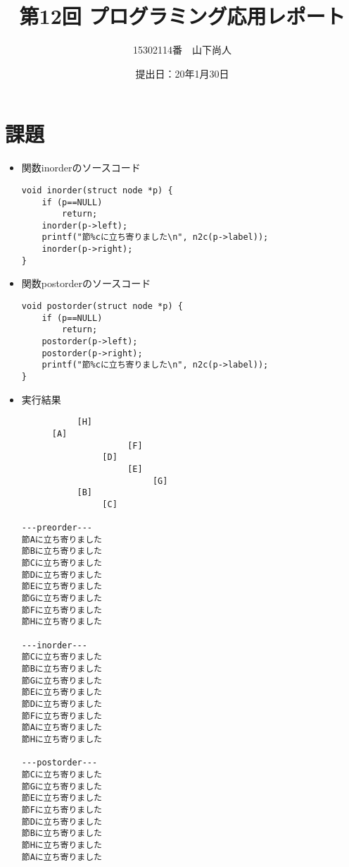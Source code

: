\documentclass[a4paper]{jsarticle}
\title{第12回 プログラミング応用レポート}
\author{15302114番　山下尚人}
\date{提出日：20年1月30日}
\begin{document}
\maketitle%

\section*{課題}
	\begin{itemize}
	\item 関数inorderのソースコード
		\begin{lstlisting}
void inorder(struct node *p) {
	if (p==NULL)
		return;
	inorder(p->left);
	printf("節%cに立ち寄りました\n", n2c(p->label));
	inorder(p->right);
}
		\end{lstlisting}
		\mbox{}\newline
	\item 関数postorderのソースコード
		\begin{lstlisting}
void postorder(struct node *p) {
	if (p==NULL)
		return;
	postorder(p->left);
	postorder(p->right);
	printf("節%cに立ち寄りました\n", n2c(p->label));
}
		\end{lstlisting}
		\mbox{}\newpage
	\item 実行結果
		\begin{lstlisting}
           [H]
      [A]
                     [F]
                [D]
                     [E]
                          [G]
           [B]
                [C]

---preorder---
節Aに立ち寄りました
節Bに立ち寄りました
節Cに立ち寄りました
節Dに立ち寄りました
節Eに立ち寄りました
節Gに立ち寄りました
節Fに立ち寄りました
節Hに立ち寄りました

---inorder---
節Cに立ち寄りました
節Bに立ち寄りました
節Gに立ち寄りました
節Eに立ち寄りました
節Dに立ち寄りました
節Fに立ち寄りました
節Aに立ち寄りました
節Hに立ち寄りました

---postorder---
節Cに立ち寄りました
節Gに立ち寄りました
節Eに立ち寄りました
節Fに立ち寄りました
節Dに立ち寄りました
節Bに立ち寄りました
節Hに立ち寄りました
節Aに立ち寄りました
		\end{lstlisting}
		\mbox{}
		
	\end{itemize}
\end{document}
